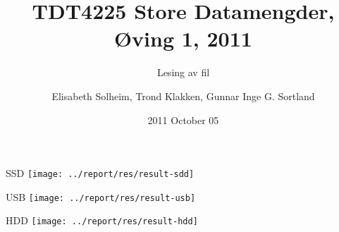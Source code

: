 \documentclass[screen]{beamer} %
\title[TDT4225 Store Datamengder, 2011] {TDT4225 Store Datamengder, Øving 1, 2011}
\subtitle{Lesing av fil}
\author[Solheim, Klakken, Sortland]{Elisabeth Solheim, Trond Klakken, \newline Gunnar Inge G. Sortland}
\institute[NTNU]{Department of Computer and Information Science}
\date{2011 October 05}
\begin{document}
\ntnutitlepage

\begin{frame}
  \begin{center}
    SSD
    \texttt{[image: ../report/res/result-sdd]} 
  \end{center}
\end{frame}

\begin{frame}
  \begin{center}
    USB
    \texttt{[image: ../report/res/result-usb]} 
  \end{center}
\end{frame}

\begin{frame}
  \begin{center}
    HDD
    \texttt{[image: ../report/res/result-hdd]} 
  \end{center}
\end{frame}
\end{document}
